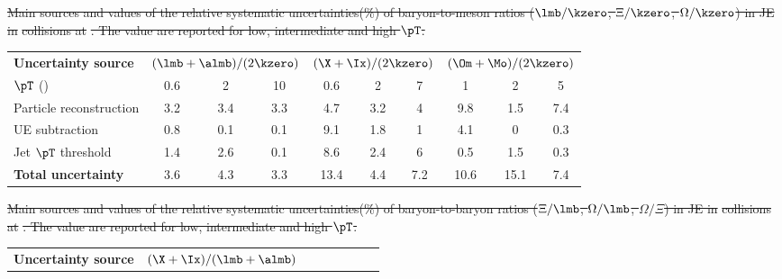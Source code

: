 \documentclass[ALICE,manyauthors]{cernphprep}
\providecommand{\DIFdel}[1]{{\protect\color{red}\sout{#1}}}                      %
\providecommand{\DIFdelFL}[1]{\DIFdel{#1}} %
\providecommand{\DIFdelbeginFL}{} %
\providecommand{\DIFdelendFL}{} %
\begin{document}
\begin{table}[!ht]
\begin{center}
{%
\DIFdelFL{Main sources and values of the relative systematic uncertainties(\%) of baryon-to-meson ratios ($\lmb/\kzero$, $\Xi/\kzero$, $\Omega/\kzero$) in JE in }%
\DIFdelFL{collisions at }%
\DIFdelFL{.
			The value are reported for low, intermediate and high $\pT$.}}
\DIFdelendFL \begin{tabularx}{\textwidth}{@{} lCCCCCCCCC @{}}
		    \toprule
		    \textbf{Uncertainty source} & 
		    & 
		    &  \\
	  	    \cmidrule(lr){2-4} \cmidrule(lr){5-7} \cmidrule(lr){8-10}
		    $\pT$ (\GeVc) & 0.6 & 2 &10  & 0.6 & 2 & 7 & 1 & 2 & 5 \\
		    \midrule
		    Particle reconstruction& 3.2& 3.4& 3.3& 4.7& 3.2& 4& 9.8& 1.5& 7.4\\
	 	    UE subtraction& 0.8& 0.1& 0.1& 9.1& 1.8& 1& 4.1& 0& 0.3\\
		    Jet $\pT$ threshold& 1.4& 2.6& 0.1& 8.6& 2.4& 6& 0.5& 1.5& 0.3\\
		    \midrule
		    \textbf{Total uncertainty}& 3.6& 4.3& 3.3& 13.4& 4.4& 7.2& 10.6& 15.1& 7.4\\
		    \bottomrule
	        \end{tabularx}
	        \DIFdelbeginFL %
{%
\DIFdelFL{Main sources and values of the relative systematic uncertainties(\%) of baryon-to-baryon ratios ($\Xi/\lmb$, $\Omega/\lmb$, $\Omega/\Xi$) in JE in }%
\DIFdelFL{collisions at }%
\DIFdelFL{.
			The value are reported for low, intermediate and high $\pT$.}}
\DIFdelendFL \begin{tabularx}{\textwidth}{@{} lCCCCCCCCC @{}}
		    \toprule
		    \textbf{Uncertainty source} & 

\end{tabularx}
\end{center}
\end{table}
\end{document}
